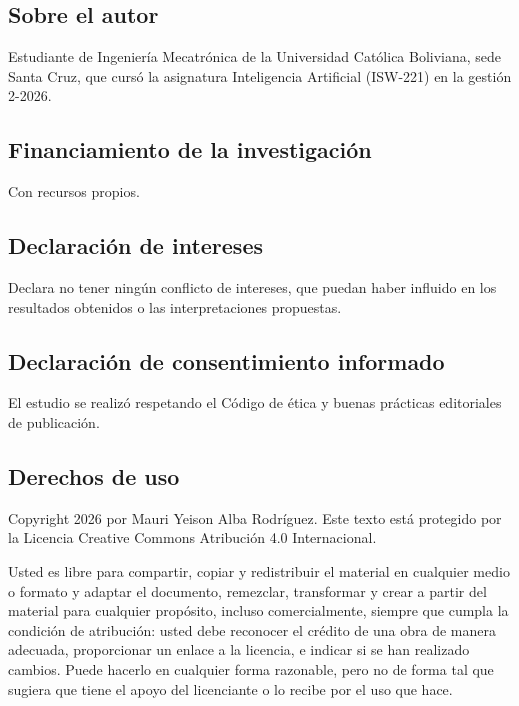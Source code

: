 \subsection*{Sobre el autor}
Estudiante de Ingeniería Mecatrónica de la Universidad Católica Boliviana, sede Santa Cruz, que cursó la asignatura Inteligencia Artificial (ISW-221) en la gestión 2-2026.

\subsection*{Financiamiento de la investigación}
Con recursos propios.

\subsection*{Declaración de intereses}
Declara no tener ningún conflicto de intereses, que puedan haber influido en los resultados obtenidos o las interpretaciones propuestas.

\subsection*{Declaración de consentimiento informado}
El estudio se realizó respetando el Código de ética y buenas prácticas editoriales de publicación.

\subsection*{Derechos de uso}
Copyright\textcopyright{} 2026 por Mauri Yeison Alba Rodríguez. Este texto está protegido por la Licencia Creative Commons Atribución 4.0 Internacional.

Usted es libre para compartir, copiar y redistribuir el material en cualquier medio o formato y adaptar el documento, remezclar, transformar y crear a partir del material para cualquier propósito, incluso comercialmente, siempre que cumpla la condición de atribución: usted debe reconocer el crédito de una obra de manera adecuada, proporcionar un enlace a la licencia, e indicar si se han realizado cambios. Puede hacerlo en cualquier forma razonable, pero no de forma tal que sugiera que tiene el apoyo del licenciante o lo recibe por el uso que hace.
